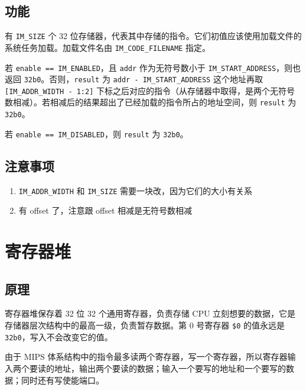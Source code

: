 \documentclass[12pt,AutoFakeBold,AutoFakeSlant]{article}
\providecommand{\tightlist}{%
  \setlength{\itemsep}{0pt}\setlength{\parskip}{0pt}}
\begin{document}
\hypertarget{ux529fux80fd-3}{%
\subsection{功能}\label{ux529fux80fd-3}}

有 \texttt{IM\_SIZE} 个 32 位存储器，代表其中存储的指令。它们初值应该使用加载文件的系统任务加载。加载文件名由 \texttt{IM\_CODE\_FILENAME} 指定。 

若 \texttt{enable\ ==\ IM\_ENABLED}，且 \texttt{addr} 作为无符号数小于
\texttt{IM\_START\_ADDRESS}，则也返回
\texttt{32\textquotesingle{}b0}。否则，\texttt{result} 为
\texttt{addr\ -\ IM\_START\_ADDRESS} 这个地址再取
\texttt{{[}IM\_ADDR\_WIDTH\ -\ 1:2{]}}
下标之后对应的指令（从存储器中取得，是两个无符号数相减）。若相减后的结果超出了已经加载的指令所占的地址空间，则
\texttt{result} 为 \texttt{32\textquotesingle{}b0}。

若 \texttt{enable\ ==\ IM\_DISABLED}，则 \texttt{result} 为
\texttt{32\textquotesingle{}b0}。

\hypertarget{ux6ce8ux610fux4e8bux9879-2}{%
\subsection{注意事项}\label{ux6ce8ux610fux4e8bux9879-2}}

\begin{enumerate}
\def\labelenumi{\arabic{enumi}.}
\tightlist
\item
  \texttt{IM\_ADDR\_WIDTH} 和 \texttt{IM\_SIZE}
  需要一块改，因为它们的大小有关系
\item
  有 offset 了，注意跟 offset 相减是无符号数相减
\end{enumerate}

\hypertarget{ux5bc4ux5b58ux5668ux5806}{%
\section{寄存器堆}\label{ux5bc4ux5b58ux5668ux5806}}

\hypertarget{ux539fux7406-2}{%
\subsection{原理}\label{ux539fux7406-2}}

寄存器堆保存着 32 位 32 个通用寄存器，负责存储 CPU
立刻想要的数据，它是存储器层次结构中的最高一级，负责暂存数据。第 0
号寄存器 \texttt{\$0} 的值永远是
\texttt{32\textquotesingle{}b0}，写入不会改变它的值。

由于 MIPS 体系结构中的指令最多读两个寄存器，写一个寄存器，所以寄存器输入两个要读的地址，输出两个要读的数据；输入一个要写的地址和一个要写的数据；同时还有写使能端口。
\end{document}
